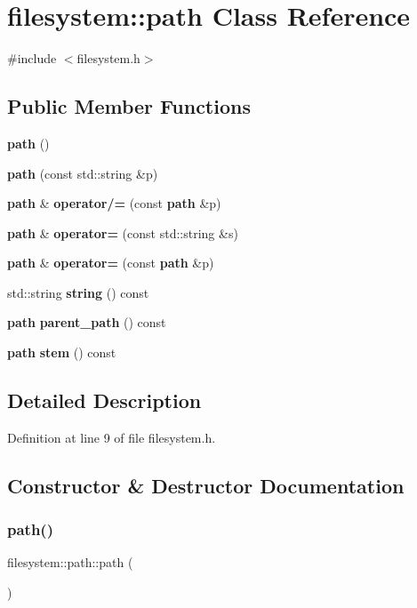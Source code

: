 \section{filesystem\+::path Class Reference}
\label{classfilesystem_1_1path}


{\ttfamily \#include $<$filesystem.\+h$>$}

\subsection*{Public Member Functions}
\begin{DoxyCompactItemize}
\item 
\textbf{ path} ()
\item 
\textbf{ path} (const std\+::string \&p)
\item 
\textbf{ path} \& \textbf{ operator/=} (const \textbf{ path} \&p)
\item 
\textbf{ path} \& \textbf{ operator=} (const std\+::string \&s)
\item 
\textbf{ path} \& \textbf{ operator=} (const \textbf{ path} \&p)
\item 
std\+::string \textbf{ string} () const
\item 
\textbf{ path} \textbf{ parent\+\_\+path} () const
\item 
\textbf{ path} \textbf{ stem} () const
\end{DoxyCompactItemize}


\subsection{Detailed Description}


Definition at line 9 of file filesystem.\+h.



\subsection{Constructor \& Destructor Documentation}
\mbox{\label{classfilesystem_1_1path_a6a63fbe8382534719d1e8a3bf3476ae2}} 
\subsubsection{path()\hspace{0.1cm}{\footnotesize\ttfamily [1/2]}}
{\footnotesize\ttfamily filesystem\+::path\+::path (\begin{DoxyParamCaption}{ }\end{DoxyParamCaption})\hspace{0.3cm}{\ttfamily [inline]}}



